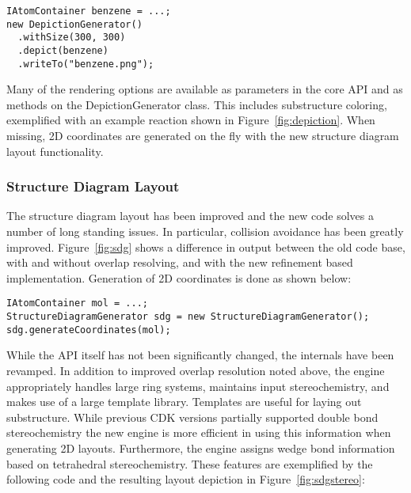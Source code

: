 \documentclass[doublespacing]{bmcart}
\begin{document}
\vspace{0.2cm}
\begin{verbatim}
IAtomContainer benzene = ...;
new DepictionGenerator()
  .withSize(300, 300)
  .depict(benzene)
  .writeTo("benzene.png");
\end{verbatim}
\vspace{0.2cm}

  Many of the rendering options are available as parameters in the
  core API and as methods on the DepictionGenerator class. This
  includes substructure coloring, exemplified with an example reaction
  shown in Figure~\ref{fig:depiction}.
  When missing, 2D coordinates are generated on the fly with the new structure
  diagram layout functionality.

  \subsubsection*{Structure Diagram Layout}

  The structure diagram layout has been improved and the new code solves a
  number of long standing issues. In particular, collision avoidance has been
  greatly improved. Figure~\ref{fig:sdg} shows a difference in output
  between the old code base, with and without overlap resolving, and with the
  new refinement based implementation\cite{Helson07}. Generation of 2D coordinates is done as shown below:

\vspace{0.2cm}
\begin{verbatim}
IAtomContainer mol = ...;
StructureDiagramGenerator sdg = new StructureDiagramGenerator();
sdg.generateCoordinates(mol);
\end{verbatim}
\vspace{0.2cm}

  While the API itself has not been significantly changed, the
  internals have been revamped. In addition to improved overlap
  resolution noted above, the engine appropriately handles large ring
  systems, maintains input stereochemistry, and makes use of a large
  template library. Templates are useful for laying out substructure.
  While previous CDK versions partially supported 
  double bond stereochemistry the new engine is more efficient in
  using this information when generating 2D layouts. Furthermore, the
  engine assigns wedge bond information based on tetrahedral
  ste\-reo\-chem\-is\-try. These features are exemplified by the following
  code and the resulting layout depiction in
  Figure~\ref{fig:sdgstereo}:
\end{document}
